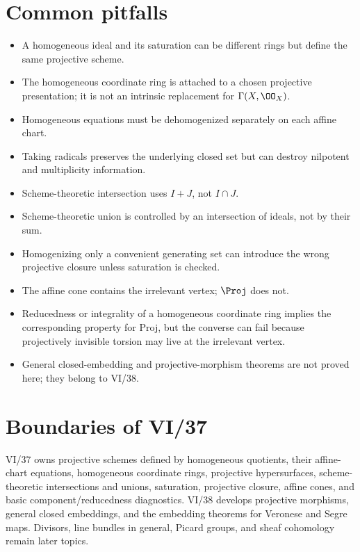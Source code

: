 

\section{Common pitfalls}
\begin{itemize}
\item A homogeneous ideal and its saturation can be different rings but define the same projective scheme.
\item The homogeneous coordinate ring is attached to a chosen projective presentation; it is not an intrinsic replacement for \(\Gamma(X,\OO_X)\).
\item Homogeneous equations must be dehomogenized separately on each affine chart.
\item Taking radicals preserves the underlying closed set but can destroy nilpotent and multiplicity information.
\item Scheme-theoretic intersection uses \(I+J\), not \(I\cap J\).
\item Scheme-theoretic union is controlled by an intersection of ideals, not by their sum.
\item Homogenizing only a convenient generating set can introduce the wrong projective closure unless saturation is checked.
\item The affine cone contains the irrelevant vertex; \(\Proj\) does not.
\item Reducedness or integrality of a homogeneous coordinate ring implies the corresponding property for Proj, but the converse can fail because projectively invisible torsion may live at the irrelevant vertex.
\item General closed-embedding and projective-morphism theorems are not proved here; they belong to VI/38.
\end{itemize}

\section{Boundaries of VI/37}
VI/37 owns projective schemes defined by homogeneous quotients, their affine-chart equations, homogeneous coordinate rings, projective hypersurfaces, scheme-theoretic intersections and unions, saturation, projective closure, affine cones, and basic component/reducedness diagnostics.  VI/38 develops projective morphisms, general closed embeddings, and the embedding theorems for Veronese and Segre maps.  Divisors, line bundles in general, Picard groups, and sheaf cohomology remain later topics.

